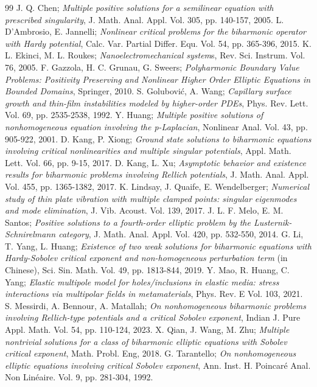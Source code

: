 \documentclass[10pt,a4paper]{amsart}
\numberwithin{equation}{section}
\begin{document}
\begin{thebibliography}{99}
 J. Q. Chen; \emph{Multiple positive solutions for a semilinear equation with prescribed singularity}, J. Math. Anal. Appl. Vol. 305, pp. 140-157, 2005.
 L. D'Ambrosio, E. Jannelli; \emph{Nonlinear critical problems for the biharmonic operator with Hardy potential}, Calc. Var. Partial Differ. Equ. Vol. 54, pp. 365-396, 2015.
 K. L. Ekinci, M. L. Roukes; \emph{Nanoelectromechanical system}s, Rev. Sci. Instrum. Vol. 76, 2005.
 F. Gazzola, H. C. Grunau, G. Sweers; \emph{Polyharmonic Boundary Value Problems: Positivity Preserving and Nonlinear Higher Order Elliptic Equations in Bounded Domains}, Springer, 2010.
 S. Golubovi\'c, A. Wang; \emph{Capillary surface growth and thin-film instabilities modeled by higher-order PDEs}, Phys. Rev. Lett. Vol. 69, pp. 2535-2538, 1992.
 Y. Huang; \emph{Multiple positive solutions of nonhomogeneous equation involving the p-Laplacian}, Nonlinear Anal. Vol. 43, pp. 905-922, 2001.
 D. Kang, P. Xiong; \emph{Ground state solutions to biharmonic equations involving critical nonlinearities and multiple singular potentials}, Appl. Math. Lett. Vol. 66, pp. 9-15, 2017.
 D. Kang, L. Xu; \emph{Asymptotic behavior and existence results for biharmonic problems involving Rellich potentials}, J. Math. Anal. Appl. Vol. 455, pp. 1365-1382, 2017.
 K. Lindsay, J. Quaife, E. Wendelberger; \emph{Numerical study of thin plate vibration with multiple clamped points: singular eigenmodes and mode elimination}, J. Vib. Acoust. Vol. 139, 2017.
 J. L. F. Melo, E. M. Santos; \emph{Positive solutions to a fourth-order elliptic problem by the Lusternik-Schnirelmann category}, J. Math. Anal. Appl. Vol. 420, pp. 532-550, 2014.
 G. Li, T. Yang, L. Huang; \emph{Existence of two weak solutions for biharmonic equations with Hardy-Sobolev critical exponent and non-homogeneous perturbation term} (in Chinese), Sci. Sin. Math. Vol. 49, pp. 1813-844, 2019.
 Y. Mao, R. Huang, C. Yang; \emph{Elastic multipole model for holes/inclusions in elastic media: stress interactions via multipolar fields in metamaterials}, Phys. Rev. E Vol. 103, 2021.
 S. Messirdi, A. Bennour, A. Matallah; \emph{On nonhomogeneous biharmonic problems involving Rellich-type potentials and a critical Sobolev exponent}, Indian J. Pure Appl. Math. Vol. 54, pp. 110-124, 2023.
 X. Qian, J. Wang, M. Zhu; \emph{Multiple nontrivial solutions for a class of biharmonic elliptic equations with Sobolev critical exponent}, Math. Probl. Eng, 2018.
 G. Tarantello; \emph{On nonhomogeneous elliptic equations involving critical Sobolev exponent}, Ann. Inst. H. Poincar\'e Anal. Non Lin\'eaire. Vol. 9, pp. 281-304, 1992.
\end{thebibliography}
\end{document}
